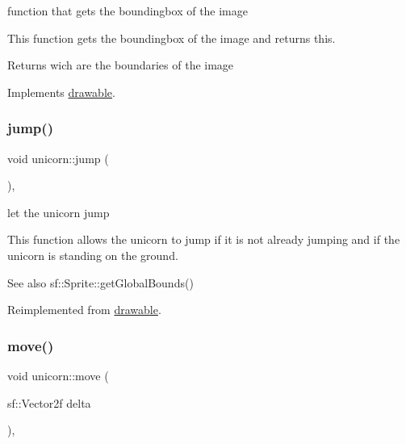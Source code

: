 function that gets the boundingbox of the image 

This function gets the boundingbox of the image and returns this.

\begin{DoxyReturn}{Returns}
wich are the boundaries of the image 
\end{DoxyReturn}


Implements \hyperlink{classdrawable_ae013ac0be47538be9ce885d6642daf73}{drawable}.

\mbox{\label{classunicorn_a07d5ca4e66632c0e871221a27146805a}} 
\subsubsection{\texorpdfstring{jump()}{jump()}}
{\footnotesize\ttfamily void unicorn\+::jump (\begin{DoxyParamCaption}{ }\end{DoxyParamCaption})\hspace{0.3cm}{\ttfamily [override]}, {\ttfamily [virtual]}}



let the unicorn jump 

This function allows the unicorn to jump if it is not already jumping and if the unicorn is standing on the ground.

\begin{DoxySeeAlso}{See also}
sf\+::\+Sprite\+::get\+Global\+Bounds() 
\end{DoxySeeAlso}


Reimplemented from \hyperlink{classdrawable_ac39691470b7874f5dec59efe649d3981}{drawable}.

\mbox{\label{classunicorn_a162f200a68342f7bc0baaf17c8cf3f9f}} 
\subsubsection{\texorpdfstring{move()}{move()}}
{\footnotesize\ttfamily void unicorn\+::move (\begin{DoxyParamCaption}\item[{sf\+::\+Vector2f}]{delta }\end{DoxyParamCaption})\hspace{0.3cm}{\ttfamily [override]}, {\ttfamily [virtual]}}



